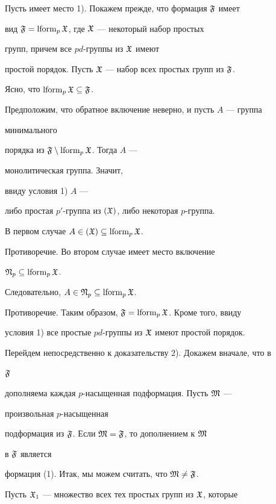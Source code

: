 \begin{pf} Пусть имеет место 1). Покажем прежде, что формация $\frak F$ имеет 


вид $\frak F=\operatorname{lform}_p\frak X$, где $\frak X$ --- некоторый набор простых 


групп, причем все $pd$-группы из $\frak X$ имеют


простой порядок. Пусть $\frak X$ --- набор всех простых групп из $\frak F$. 


Ясно, что $\operatorname{lform}_p\frak X\subseteq\frak F$. 


Предположим, что обратное включение неверно, и пусть $A$ --- группа 


минимального 


порядка из $\frak F\setminus\operatorname{lform}_p\frak X$. Тогда $A$ --- 


монолитическая группа. Значит, 


ввиду условия 1) $A$ --- 


либо простая $p'$-группа из $(\frak X)$, либо некоторая $p$-группа. 


В первом случае $A\in(\frak X)\subseteq\operatorname{lform}_p\frak X$. 


Противоречие. Во втором случае имеет место включение 


$\frak N_p\subseteq\operatorname{lform}_p\frak X$. 


Следовательно, $A\in\frak N_p\subseteq\operatorname{lform}_p\frak X$. 


Противоречие. Таким образом, $\frak F=\operatorname{lform}_p\frak X$. Кроме того, ввиду 


условия 1) все простые $pd$-группы из $\frak X$ имеют простой порядок. 


 


Перейдем непосредственно к доказательству 2). Докажем вначале, что в 


$\frak F$ 


дополняема каждая $p$-насыщенная подформация. Пусть $\frak M$ --- 


произвольная $p$-насыщенная 


подформация из $\frak F$. Если $\frak M=\frak F$, то дополнением к $\frak M$ 


в $\frak F$ является 


формация (1). Итак, мы можем считать, что $\frak M\ne\frak F$. 


 


Пусть $\frak X_1$ --- множество всех тех простых групп из $\frak X$, которые 



\end{pf}
